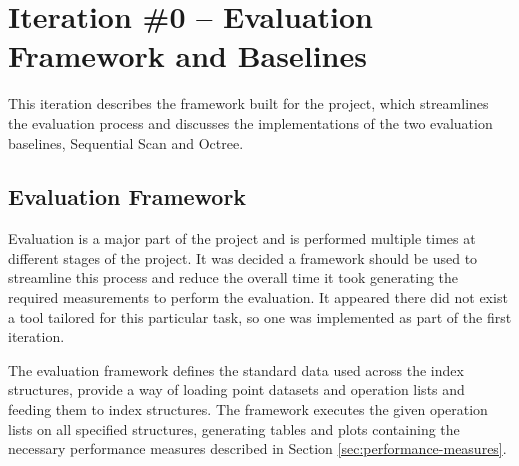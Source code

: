 \section{Iteration \#0 -- Evaluation Framework and Baselines}

This iteration describes the framework built for the project, which streamlines the evaluation process and discusses the implementations of the two evaluation baselines, Sequential Scan and Octree.

\subsection{Evaluation Framework}

Evaluation is a major part of the project and is performed multiple times at different stages of the project. It was decided a framework should be used to streamline this process and reduce the overall time it took generating the required measurements to perform the evaluation. It appeared there did not exist a tool tailored for this particular task, so one was implemented as part of the first iteration.

The evaluation framework defines the standard data used across the index structures, provide a way of loading point datasets and operation lists and feeding them to index structures. The framework executes the given operation lists on all specified structures, generating tables and plots containing the necessary performance measures described in Section \ref{sec:performance-measures}.


